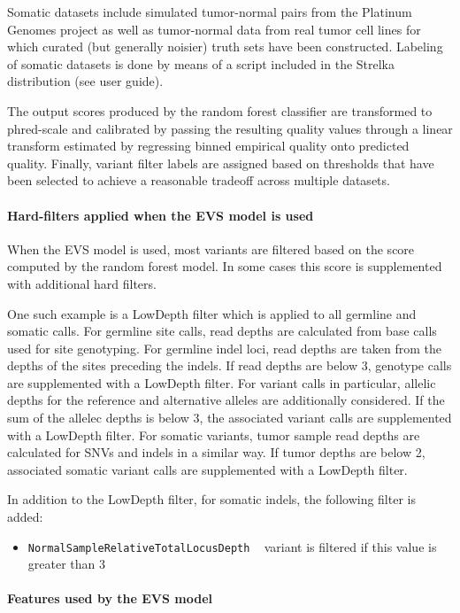 \documentclass{article}
\begin{document}
Somatic datasets include simulated tumor-normal pairs from the Platinum Genomes project as well as tumor-normal data from real tumor cell lines for which curated (but generally noisier) truth sets have been constructed. Labeling of somatic datasets is done by means of a script included in the Strelka distribution (see user guide).

The output scores produced by the random forest classifier are transformed to phred-scale and calibrated by passing the resulting quality values through a linear transform estimated by regressing binned empirical quality onto predicted quality. Finally, variant filter labels are assigned based on thresholds that have been selected to achieve a reasonable tradeoff across multiple datasets.

\paragraph{Hard-filters applied when the EVS model is used}

When the EVS model is used, most variants are filtered based on the score computed by the random forest model. In some cases this score is supplemented with additional hard filters.

One such example is a LowDepth filter which is applied to all germline and somatic calls. For germline site calls, read depths are calculated from base calls used for site genotyping. For germline indel loci, read depths are taken from the depths of the sites preceding the indels. If read depths are below 3, genotype calls are supplemented with a LowDepth filter. For variant calls in particular, allelic depths for the reference and alternative alleles are additionally considered. If the sum of the allelec depths is below 3, the associated variant calls are supplemented with a LowDepth filter. For somatic variants, tumor sample read depths are calculated for SNVs and indels in a similar way. If tumor depths are below 2, associated somatic variant calls are supplemented with a LowDepth filter.

In addition to the LowDepth filter, for somatic indels, the following filter is added:

\begin{itemize}
    \item \texttt{NormalSampleRelativeTotalLocusDepth} ~ variant is filtered if this value is greater than 3
\end{itemize}


\paragraph{Features used by the EVS model}
\end{document}
